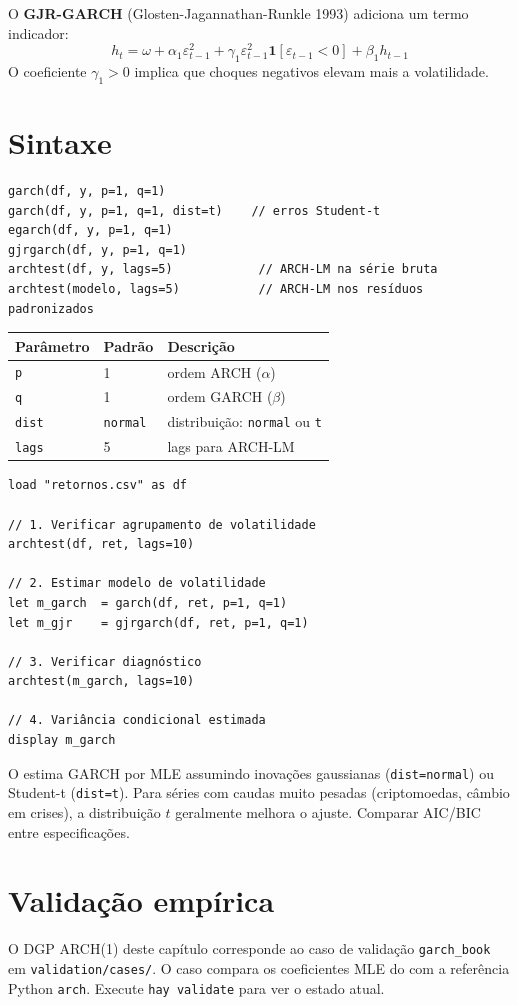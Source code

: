 O \textbf{GJR-GARCH} (Glosten-Jagannathan-Runkle 1993) adiciona um termo
indicador:
\[
  h_t = \omega + \alpha_1 \varepsilon_{t-1}^2
        + \gamma_1 \varepsilon_{t-1}^2 \mathbf{1}[\varepsilon_{t-1} < 0]
        + \beta_1 h_{t-1}
\]
O coeficiente $\gamma_1 > 0$ implica que choques negativos elevam mais a
volatilidade.

\section{Sintaxe}

\begin{lstlisting}
garch(df, y, p=1, q=1)
garch(df, y, p=1, q=1, dist=t)    // erros Student-t
egarch(df, y, p=1, q=1)
gjrgarch(df, y, p=1, q=1)
archtest(df, y, lags=5)            // ARCH-LM na série bruta
archtest(modelo, lags=5)           // ARCH-LM nos resíduos padronizados
\end{lstlisting}

\begin{center}
\begin{tabular}{lll}
\toprule
\textbf{Parâmetro} & \textbf{Padrão} & \textbf{Descrição} \\
\midrule
\texttt{p}    & 1                & ordem ARCH ($\alpha$) \\
\texttt{q}    & 1                & ordem GARCH ($\beta$) \\
\texttt{dist} & \texttt{normal}  & distribuição: \texttt{normal} ou \texttt{t} \\
\texttt{lags} & 5                & lags para ARCH-LM \\
\bottomrule
\end{tabular}
\end{center}

\begin{lstlisting}[caption={Fluxo típico — retornos de ativos}]
load "retornos.csv" as df

// 1. Verificar agrupamento de volatilidade
archtest(df, ret, lags=10)

// 2. Estimar modelo de volatilidade
let m_garch  = garch(df, ret, p=1, q=1)
let m_gjr    = gjrgarch(df, ret, p=1, q=1)

// 3. Verificar diagnóstico
archtest(m_garch, lags=10)

// 4. Variância condicional estimada
display m_garch
\end{lstlisting}

\begin{nota}
  O \hayashi{} estima GARCH por MLE assumindo inovações gaussianas
  (\lstinline{dist=normal}) ou Student-t (\lstinline{dist=t}). Para séries
  com caudas muito pesadas (criptomoedas, câmbio em crises), a distribuição
  $t$ geralmente melhora o ajuste. Comparar AIC/BIC entre especificações.
\end{nota}

\section{Validação empírica}

O DGP ARCH(1) deste capítulo corresponde ao caso de validação
\texttt{garch\_book} em \texttt{validation/cases/}. O caso compara os
coeficientes MLE do \hayashi{} com a referência Python \texttt{arch}. Execute
\lstinline{hay validate} para ver o estado atual.
